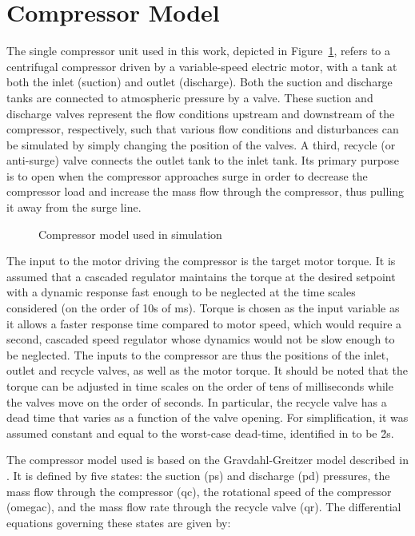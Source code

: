 \section{Compressor Model}
\label{sec:mod:comp}

The single compressor unit used in this work, depicted in Figure~\ref{fig:mod:single_comp}, refers to a centrifugal compressor driven by a variable-speed electric motor, with a tank at both the inlet (suction) and outlet (discharge).
Both the suction and discharge tanks are connected to atmospheric pressure by a valve.
These suction and discharge valves represent the flow conditions upstream and downstream of the compressor, respectively, such that various flow conditions and disturbances can be simulated by simply changing the position of the valves.
A third, recycle (or anti-surge) valve connects the outlet tank to the inlet tank. Its primary purpose is to open when the compressor approaches surge in order to decrease the compressor load and increase the mass flow through the compressor, thus pulling it away from the surge line.

\begin{figure}
  \centering
  \resizebox{0.7\linewidth}{!}{%
    \begin{tikzpicture}
      \drawcomp
    \end{tikzpicture}
  }
  \caption{Compressor model used in simulation}
  \label{fig:mod:single_comp}
\end{figure}


The input to the motor driving the compressor is the target motor torque.
It is assumed that a cascaded regulator maintains the torque at the desired setpoint with a dynamic response fast enough to be neglected at the time scales considered (on the order of 10s of ms).
Torque is chosen as the input variable as it allows a faster response time compared to motor speed, which would require a second, cascaded speed regulator whose dynamics would not be slow enough to be neglected.
The inputs to the compressor are thus the positions of the inlet, outlet and recycle valves, as well as the motor torque.
It should be noted that the torque can be adjusted in time scales on the order of tens of milliseconds while the valves move on the order of seconds.
In particular, the recycle valve has a dead time that varies as a function of the valve opening. For simplification, it was assumed constant and equal to the worst-case dead-time, identified in \cite{Cortinovis2015} to be \u{2}{s}.


The compressor model used is based on the Gravdahl-Greitzer model described in \cite{Gravdahl1999}. It is defined by five states: the suction (\gls{ps}) and discharge (\gls{pd}) pressures, the mass flow through the compressor (\gls{qc}), the rotational speed of the compressor (\gls{omegac}), and the mass flow rate through the recycle valve (\gls{qr}).
The differential equations governing these states are given by:


